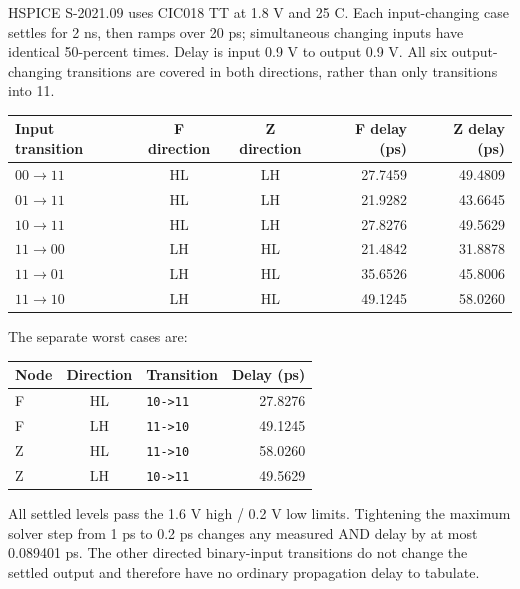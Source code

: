 \documentclass[11pt]{article}
\newcommand{\mos}[4]{\begin{scope}[shift={(#1,#2)}]
\draw (0,.24)--(0,-.24);
\draw (0,.20)--(.25,.20)--(.25,.5);
\draw (0,-.20)--(.25,-.20)--(.25,-.5);
\draw (-.16,.23)--(-.16,-.23);
\ifnum#4=1\draw (-.26,0) circle (.06);\draw (-.75,0)--(-.32,0);\else\draw (-.75,0)--(-.16,0);\fi
\node[anchor=east,font=\small] at (-.76,0) {$#3$};
\end{scope}}
\newcommand{\ground}[2]{\draw (#1,#2)--(#1,{#2-.12});\draw ({#1-.17},{#2-.12})--({#1+.17},{#2-.12});\draw ({#1-.11},{#2-.20})--({#1+.11},{#2-.20});}
\newcommand{\rail}[3]{\draw (#1,#2)--(#1,{#2+.15});\node[above,font=\small] at (#1,{#2+.15}) {$#3$};}
\newcommand{\outputnode}[3]{\fill (#1,#2) circle (.04);\draw (#1,#2)--({#1+.7},#2) node[right] {$#3$};}
\begin{document}
\begin{center}\end{center}
HSPICE S-2021.09 uses CIC018 TT at 1.8 V and 25 C. Each input-changing case settles for 2 ns, then ramps over 20 ps; simultaneous changing inputs have identical 50-percent times. Delay is input 0.9 V to output 0.9 V. All six output-changing transitions are covered in both directions, rather than only transitions into 11.
\begin{center}\begin{tabular}{lccrr}\toprule Input transition&F direction&Z direction&F delay (ps)&Z delay (ps)\\\midrule
$00\to11$&HL&LH&27.7459&49.4809\\
$01\to11$&HL&LH&21.9282&43.6645\\
$10\to11$&HL&LH&27.8276&49.5629\\
$11\to00$&LH&HL&21.4842&31.8878\\
$11\to01$&LH&HL&35.6526&45.8006\\
$11\to10$&LH&HL&49.1245&58.0260\\
\bottomrule\end{tabular}\end{center}
The separate worst cases are:
\begin{center}\begin{tabular}{lclr}\toprule Node&Direction&Transition&Delay (ps)\\\midrule
F&HL&\texttt{10->11}&27.8276\\
F&LH&\texttt{11->10}&49.1245\\
Z&HL&\texttt{11->10}&58.0260\\
Z&LH&\texttt{10->11}&49.5629\\
\bottomrule\end{tabular}\end{center}
All settled levels pass the 1.6 V high / 0.2 V low limits. Tightening the maximum solver step from 1 ps to 0.2 ps changes any measured AND delay by at most 0.089401 ps. The other directed binary-input transitions do not change the settled output and therefore have no ordinary propagation delay to tabulate.
\end{document}
